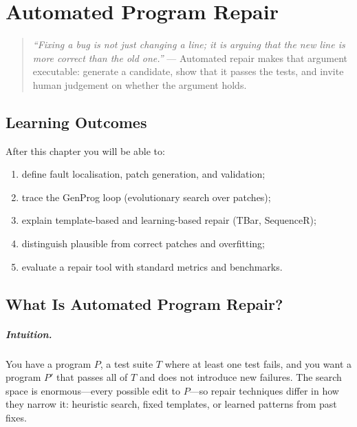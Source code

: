 \chapter{Automated Program Repair}
\label{ch:repair}
\sloppy

\begin{quote}
\emph{``Fixing a bug is not just changing a line; it is arguing that the new line is more correct than the old one.''} --- Automated repair makes that argument executable: generate a candidate, show that it passes the tests, and invite human judgement on whether the argument holds.
\end{quote}

\noindent{}
\vspace{0.4em}

\section*{Learning Outcomes}
After this chapter you will be able to:
\begin{enumerate}[label=(L\arabic*)]
    \item define fault localisation, patch generation, and validation;
    \item trace the GenProg loop (evolutionary search over patches);
    \item explain template-based and learning-based repair (TBar, SequenceR);
    \item distinguish plausible from correct patches and overfitting;
    \item evaluate a repair tool with standard metrics and benchmarks.
\end{enumerate}

\section{What Is Automated Program Repair?}
\label{sec:what-is-apr}
\paragraph{Intuition.} You have a program $P$, a test suite $T$ where at least one test fails, and you want a program $P'$ that passes all of $T$ and does not introduce new failures. The search space is enormous---every possible edit to $P$---so repair techniques differ in how they narrow it: heuristic search, fixed templates, or learned patterns from past fixes.

